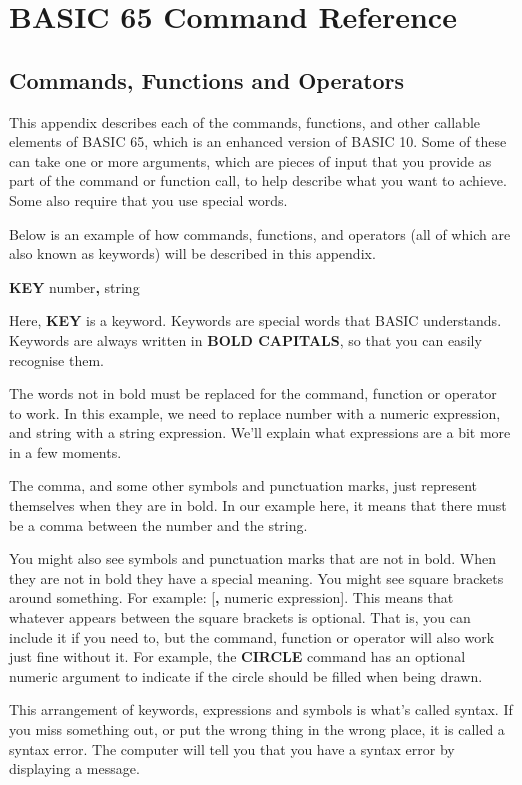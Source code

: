 \hypersetup{bookmarksdepth=2}
\chapter{BASIC 65 Command Reference}
\label{cha:basic-reference}

\section{Commands, Functions and Operators}

This appendix describes each of the commands, functions, and other callable
elements of BASIC 65, which is an enhanced version of BASIC 10. Some of these
can take one or more arguments, which are pieces of input that you provide as
part of the command or function call, to help describe what you want to achieve.
Some also require that you use special words.

Below is an example of how commands, functions, and operators
(all of which are also known as keywords) will be described in this appendix.

{\bf KEY} number{\bf,} string

Here, {\bf KEY} is a keyword. Keywords are special words that
BASIC understands. Keywords are always written in {\bf BOLD CAPITALS}, so that
you can easily recognise them.

The words not in bold must be replaced for the command, function or operator to
work. In this example, we need to replace number with a numeric expression, and
string with a string expression. We'll explain what expressions are a bit more
in a few moments.

The comma, and some other symbols and punctuation marks, just represent
themselves when they are in bold. In our example here, it means that there must
be a comma between the number and the string.

You might also see symbols and punctuation marks that are not in bold. When
they are not in bold they have a special meaning. You might see square
brackets around something. For example: [{\bf,} numeric expression]. This means
that whatever appears between the square brackets is optional. That is, you can
include it if you need to, but the command, function or operator will also work
just fine without it. For example, the {\bf CIRCLE} command has an optional
numeric argument to indicate if the circle should be filled when being drawn.

This arrangement of keywords, expressions and symbols is what's called syntax. If
you miss something out, or put the wrong thing in the wrong place, it is called
a syntax error. The computer will tell you that you have a syntax error by displaying
a  message.

